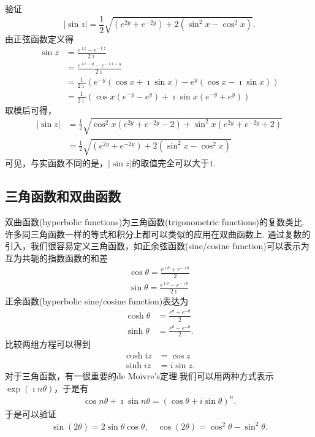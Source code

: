 \begin{examplebox}{验证\begin{equation*}
    |\sin z|=\frac{1}{2} \sqrt{\left(e^{2 y}+e^{-2 y}\right)+2\left(\sin ^2 x-\cos ^2 x\right)} .
    \end{equation*}
    }
    由正弦函数定义得
    \begin{align*}
        \sin z &= \frac{e^{\imath z} - e^{-\imath z}}{2\imath} 
        \\ 
        & = \frac{e^{\imath x - y} - e^{-\imath x + y}}{2\imath}
        \\
        & = \frac{1}{2\imath}\left( e^{-y} (\cos x + \imath \sin x ) - e^{y} (\cos x - \imath \sin x ) \right) 
        \\
        & = \frac{1}{2\imath} \left( \cos x (e^{-y} - e^{y}) + \imath \sin x (e^{-y} + e^{y}) \right)
    \end{align*}
    取模后可得，
    \begin{align*}
        |\sin z | &= \frac{1}{2}\sqrt{ \cos^2x (e^{2y} + e^{-2y} -2) + \sin^2 x (e^{2y} + e^{-2y} +2) }
        \\
        &=\frac{1}{2}\sqrt{\left(e^{2 y}+e^{-2 y}\right)+2\left(\sin ^2 x-\cos ^2 x\right)}
    \end{align*}
    可见，与实函数不同的是，$|\sin z|$的取值完全可以大于$1$.
\end{examplebox}


\subsection{三角函数和双曲函数}
双曲函数(hyperbolic functions)为三角函数(trigonometric functions)的复数类比.
许多同三角函数一样的等式和积分上都可以类似的应用在双曲函数上.
通过复数的引入，我们很容易定义三角函数，如正余弦函数(sine/cosine function)可以表示为互为共轭的指数函数的和差
\begin{align}
    \cos \theta = \frac{e^{\imath \theta} + e^{ -\imath \theta} }{2}
    \\
    \sin \theta = \frac{e^{\imath \theta} - e^{ -\imath \theta} }{2\imath}
\end{align}
正余函数(hyperbolic sine/cosine function)表达为
\begin{align}
    \cosh \theta &= \frac{e^{\theta} + e^{ - \theta} }{2}
    \\
    \sinh \theta &= \frac{e^{\theta} - e^{ - \theta} }{2} .
\end{align}
比较两组方程可以得到
\begin{align}
    \cosh iz &= \cos z
    \\
    \sinh iz &= i \sin z.
\end{align}
对于三角函数，有一很重要的de Moivre's定理.我们可以用两种方式表示$\exp(\imath n \theta)$，于是有
\begin{align}
    \cos n \theta + \imath \sin n\theta = (\cos \theta + i \sin \theta)^n  .
\end{align}
于是可以验证
\begin{align}
    \sin(2\theta) = 2\sin\theta \cos\theta, \quad \cos (2\theta) = \cos^2\theta - \sin^2\theta .
\end{align}

